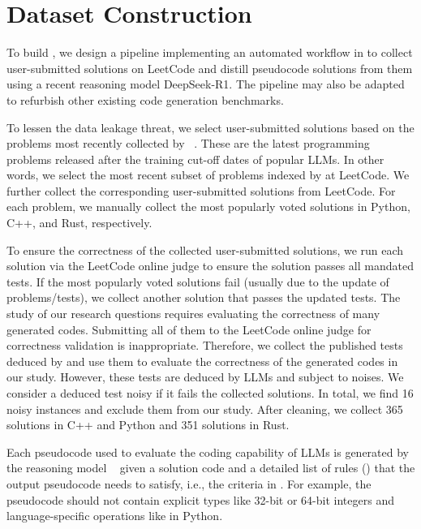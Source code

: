 \section{Dataset Construction}\label{sec:benchmark-construction}


To build \benchname, we design a pipeline implementing an automated workflow in  to collect user-submitted solutions on LeetCode and distill pseudocode solutions from them using a recent reasoning model DeepSeek-R1. The pipeline may also be adapted to refurbish other existing code generation benchmarks.

To lessen the data leakage threat, we select user-submitted solutions based on the problems most recently collected by \livecb~\cite{livecb}. These are the latest programming problems released after the training cut-off dates of popular LLMs.
In other words, we select the most recent subset of problems indexed by \livecb at LeetCode. We further collect the 
corresponding user-submitted solutions from LeetCode.
For each problem, we manually collect the most popularly voted solutions in Python, C++, and Rust, respectively.


To ensure the correctness of the collected user-submitted solutions,
we run each solution via the LeetCode online judge to ensure the solution passes all mandated tests.
If the most popularly voted solutions fail (usually due to the update of problems/tests), we collect another solution that passes the updated tests.
The study of our research questions requires evaluating the correctness of many generated codes. Submitting all of them to the LeetCode online judge for correctness validation is inappropriate. Therefore, we collect the published tests deduced by \livecb and use them to evaluate the correctness of the generated codes in our study. However, these \livecb tests are deduced by LLMs and subject to noises. %
We consider a deduced \livecb test noisy if it fails the collected solutions. %
In total, we find 16 noisy instances and exclude them from our study. 
After cleaning, we collect 365 solutions in C++ and Python and 351 solutions in Rust.

Each pseudocode used to evaluate the coding capability of LLMs is generated by the reasoning model \dsr~\cite{ds-r1} given a solution code and a detailed list of rules () that the output pseudocode needs to satisfy, i.e., the criteria in .
For example, the pseudocode should not contain explicit types like 32-bit or 64-bit integers and language-specific operations like  in Python.

